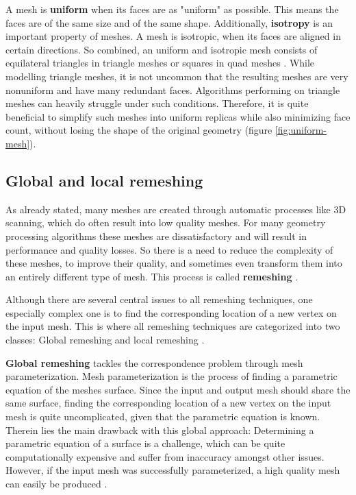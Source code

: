 \documentclass{ACGSeminar}
\begin{document}
A mesh is \textbf{uniform} when its faces are as "uniform" as possible. This means the faces are of the same size and of the same shape. Additionally, \textbf{isotropy} is an important property of meshes. A mesh is isotropic, when its faces are aligned in certain directions. So combined, an uniform and isotropic mesh consists of equilateral triangles in triangle meshes or squares in quad meshes \cite{alliez2003isotropic,surazhsky2003isotropic}. While modelling triangle meshes, it is not uncommon that the resulting meshes are very nonuniform and have many redundant faces. Algorithms performing on triangle meshes can heavily struggle under such conditions. Therefore, it is quite beneficial to simplify such meshes into uniform replicas while also minimizing face count, without losing the shape of the original geometry (figure \ref{fig:uniform-mesh}).


\subsection{Global and local remeshing}
As already stated, many meshes are created through automatic processes like 3D scanning, which do often result into low quality meshes. For many geometry processing algorithms these meshes are dissatisfactory and will result in performance and quality losses. So there is a need to reduce the complexity of these meshes, to improve their quality, and sometimes even transform them into an entirely different type of mesh. This process is called \textbf{remeshing} \cite{alliez2008recent}.\bigskip

Although there are several central issues to all remeshing techniques, one especially complex one is to find the corresponding location of a new vertex on the input mesh. This is where all remeshing techniques are categorized into two classes: Global remeshing and local remeshing \cite{botsch2007geometric,alliez2008recent}.\bigskip

\textbf{Global remeshing} tackles the correspondence problem through mesh parameterization. Mesh parameterization is the process of finding a parametric equation of the meshes surface. Since the input and output mesh should share the same surface, finding the corresponding location of a new vertex on the input mesh is quite uncomplicated, given that the parametric equation is known. Therein lies the main drawback with this global approach: Determining a parametric equation of a surface is a challenge, which can be quite computationally expensive and suffer from inaccuracy amongst other issues. However, if the input mesh was successfully parameterized, a high quality mesh can easily be produced \cite{jakob2015instant,alliez2008recent}.
\end{document}
